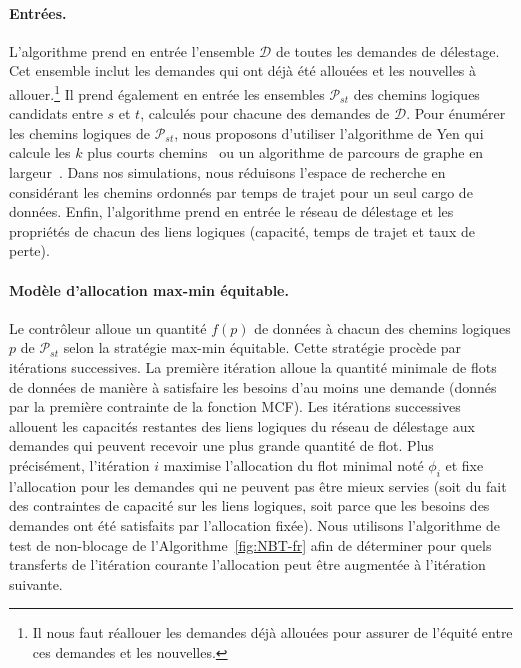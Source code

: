 \paragraph{Entrées.} 
L’algorithme prend en entrée l’ensemble $\mathcal{D}$ de toutes les demandes de délestage. Cet ensemble inclut les demandes qui ont déjà été allouées et les nouvelles à allouer.\footnote{Il nous faut réallouer les demandes déjà allouées pour assurer de l’équité entre ces demandes et les nouvelles.} Il prend également en entrée les ensembles $\mathcal{P}_{st}$ des chemins logiques candidats entre $s$ et $t$, calculés pour chacune des demandes de $\mathcal{D}$. Pour énumérer les chemins logiques de $\mathcal{P}_{st}$, nous proposons d’utiliser l’algorithme de Yen qui calcule les $k$ plus courts chemins~\cite{yen1971finding} ou un algorithme de parcours de graphe en largeur~\cite{lee1961algorithm}. Dans nos simulations, nous réduisons l’espace de recherche en considérant les chemins ordonnés par temps de trajet pour un seul cargo de données. Enfin, l’algorithme prend en entrée le réseau de délestage et les propriétés de chacun des liens logiques (\ie capacité, temps de trajet et taux de perte).  

\paragraph{Modèle d’allocation max-min équitable.} 
Le contrôleur alloue un quantité $f(p)$ de données à chacun des chemins logiques $p$ de $\mathcal{P}_{st}$ selon la stratégie max-min équitable. Cette stratégie procède par itérations successives. La première itération alloue la quantité minimale de flots de données de manière à satisfaire les besoins d’au moins une demande (donnés par la première contrainte de la fonction \textsf{MCF}). Les itérations successives allouent les capacités restantes des liens logiques du réseau de délestage aux demandes qui peuvent recevoir une plus grande quantité de flot. Plus précisément, l’itération $i$ maximise l’allocation du flot minimal noté $\phi_{i}$ et fixe l’allocation pour les demandes qui ne peuvent pas être mieux servies (\ie soit du fait des contraintes de capacité sur les liens logiques, soit parce que les besoins des demandes ont été satisfaits par l’allocation fixée). Nous utilisons l’algorithme de test de non-blocage de l’Algorithme~\ref{fig:NBT-fr} afin de déterminer pour quels transferts de l’itération courante l’allocation peut être augmentée à l’itération suivante. 
 
